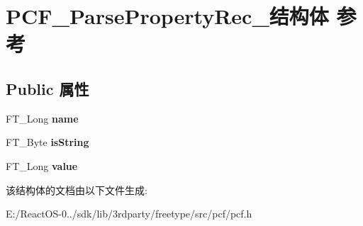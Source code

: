 \hypertarget{struct_p_c_f___parse_property_rec__}{}\section{P\+C\+F\+\_\+\+Parse\+Property\+Rec\+\_\+结构体 参考}
\label{struct_p_c_f___parse_property_rec__}
\subsection*{Public 属性}
\begin{DoxyCompactItemize}
\item 
\mbox{\label{struct_p_c_f___parse_property_rec___a3d66f8d18db9b44249a782faffa7b348}} 
F\+T\+\_\+\+Long {\bfseries name}
\item 
\mbox{\label{struct_p_c_f___parse_property_rec___a2b7224d19b12bce7094f4ef8a0f750d1}} 
F\+T\+\_\+\+Byte {\bfseries is\+String}
\item 
\mbox{\label{struct_p_c_f___parse_property_rec___aaae3096dcf2b5b5d249bf878b6cdd57f}} 
F\+T\+\_\+\+Long {\bfseries value}
\end{DoxyCompactItemize}


该结构体的文档由以下文件生成\+:\begin{DoxyCompactItemize}
\item 
E\+:/\+React\+O\+S-\/0../sdk/lib/3rdparty/freetype/src/pcf/pcf.\+h\end{DoxyCompactItemize}
